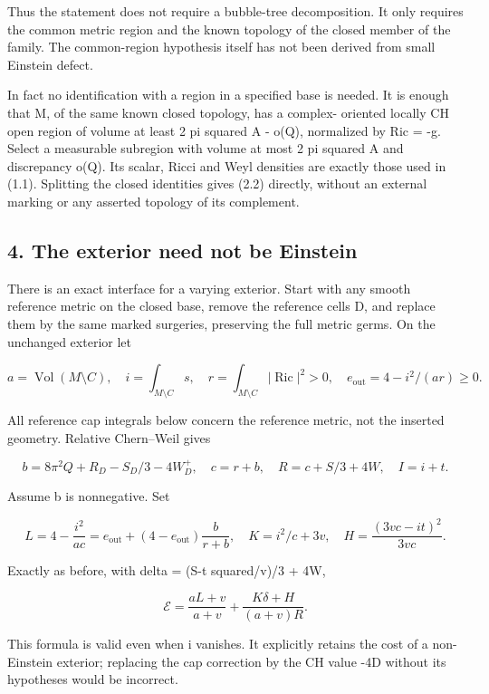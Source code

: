 \documentclass[
  10pt,
]{article}
\begin{document}
Thus the statement does not require a bubble-tree decomposition. It only
requires the common metric region and the known topology of the closed
member of the family. The common-region hypothesis itself has not been
derived from small Einstein defect.

In fact no identification with a region in a specified base is needed.
It is enough that M, of the same known closed topology, has a complex-
oriented locally CH open region of volume at least 2 pi squared A -
o(Q), normalized by Ric = -g. Select a measurable subregion with volume
at most 2 pi squared A and discrepancy o(Q). Its scalar, Ricci and Weyl
densities are exactly those used in (1.1). Splitting the closed
identities gives (2.2) directly, without an external marking or any
asserted topology of its complement.

\hypertarget{the-exterior-need-not-be-einstein}{%
\subsection{4. The exterior need not be
Einstein}\label{the-exterior-need-not-be-einstein}}

There is an exact interface for a varying exterior. Start with any
smooth reference metric on the closed base, remove the reference cells
D, and replace them by the same marked surgeries, preserving the full
metric germs. On the unchanged exterior let

\[
 a=\operatorname{Vol}(M\setminus C),\quad
 i=\int_{M\setminus C}s,\quad
 r=\int_{M\setminus C}|\operatorname{Ric}|^2>0,
 \quad e_{\mathrm{out}}=4-i^2/(ar)\ge0.
\]

All reference cap integrals below concern the reference metric, not the
inserted geometry. Relative Chern--Weil gives

\[
 b=8\pi^2Q+R_D-S_D/3-4W_D^+,\quad c=r+b,\quad
 R=c+S/3+4W,\quad I=i+t.                                 \tag{4.1}
\]

Assume b is nonnegative. Set

\[
 L=4-\frac{i^2}{ac}
  =e_{\mathrm{out}}+(4-e_{\mathrm{out}})\frac b{r+b},
 \quad K=i^2/c+3v,\quad H=\frac{(3vc-it)^2}{3vc}.
\]

Exactly as before, with delta = (S-t squared/v)/3 + 4W,

\[
 \boxed{\mathcal E=\frac{aL+v}{a+v}
                 +\frac{K\delta+H}{(a+v)R}.}             \tag{4.2}
\]

This formula is valid even when i vanishes. It explicitly retains the
cost of a non-Einstein exterior; replacing the cap correction by the CH
value -4D without its hypotheses would be incorrect.
\end{document}
